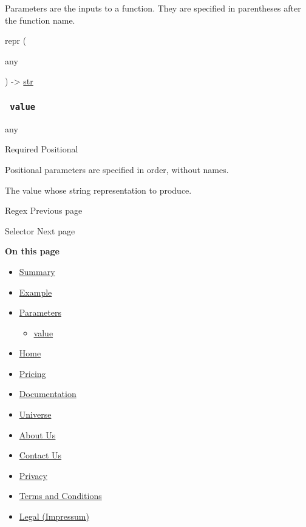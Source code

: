 \label{parameters-tooltip}
Parameters are the inputs to a function. They are specified in
parentheses after the function name.

{ repr } (

{ { any } }

) -\textgreater{} \href{/docs/reference/foundations/str/}{str}

\subsubsection{\texorpdfstring{\texttt{\ value\ }}{ value }}\label{parameters-value}

{ any }

{Required} {{ Positional }}

\label{parameters-value-positional-tooltip}
Positional parameters are specified in order, without names.

The value whose string representation to produce.

\href{/docs/reference/foundations/regex/}{\pandocbounded{}}

{ Regex } { Previous page }

\href{/docs/reference/foundations/selector/}{\pandocbounded{}}

{ Selector } { Next page }

\textbf{On this page}

\begin{itemize}
\tightlist
\item
  \hyperref[summary]{Summary}
\item
  \hyperref[example]{Example}
\item
  \hyperref[parameters]{Parameters}

  \begin{itemize}
  \tightlist
  \item
    \hyperref[parameters-value]{value}
  \end{itemize}
\end{itemize}

\begin{itemize}
\tightlist
\item
  \href{/}{Home}
\item
  \href{/pricing/}{Pricing}
\item
  \href{/docs/}{Documentation}
\item
  \href{/universe/}{Universe}
\item
  \href{/about/}{About Us}
\item
  \href{/contact/}{Contact Us}
\item
  \href{/privacy/}{Privacy}
\item
  \href{https://typst.app/terms}{Terms and Conditions}
\item
  \href{/legal/}{Legal (Impressum)}
\end{itemize}

